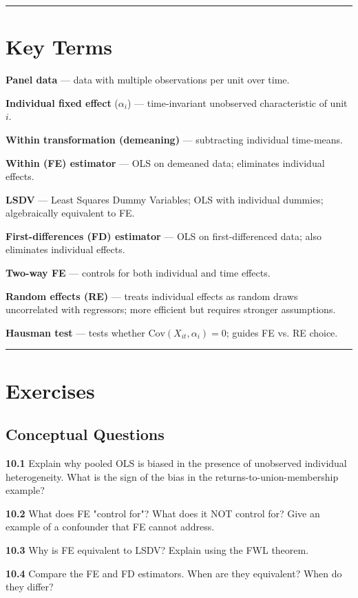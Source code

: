 \medskip\hrule\medskip

\section{Key Terms}

\textbf{Panel data} --- data with multiple observations per unit over time.

\textbf{Individual fixed effect} ($\alpha_i$) --- time-invariant unobserved characteristic of unit $i$.

\textbf{Within transformation (demeaning)} --- subtracting individual time-means.

\textbf{Within (FE) estimator} --- OLS on demeaned data; eliminates individual effects.

\textbf{LSDV} --- Least Squares Dummy Variables; OLS with individual dummies; algebraically equivalent to FE.

\textbf{First-differences (FD) estimator} --- OLS on first-differenced data; also eliminates individual effects.

\textbf{Two-way FE} --- controls for both individual and time effects.

\textbf{Random effects (RE)} --- treats individual effects as random draws uncorrelated with regressors; more efficient but requires stronger assumptions.

\textbf{Hausman test} --- tests whether $\text{Cov}(X_{it}, \alpha_i) = 0$; guides FE vs. RE choice.

\medskip\hrule\medskip

\section{Exercises}

\subsection{Conceptual Questions}

\textbf{10.1} Explain why pooled OLS is biased in the presence of unobserved individual heterogeneity. What is the sign of the bias in the returns-to-union-membership example?

\textbf{10.2} What does FE "control for"? What does it NOT control for? Give an example of a confounder that FE cannot address.

\textbf{10.3} Why is FE equivalent to LSDV? Explain using the FWL theorem.

\textbf{10.4} Compare the FE and FD estimators. When are they equivalent? When do they differ?

